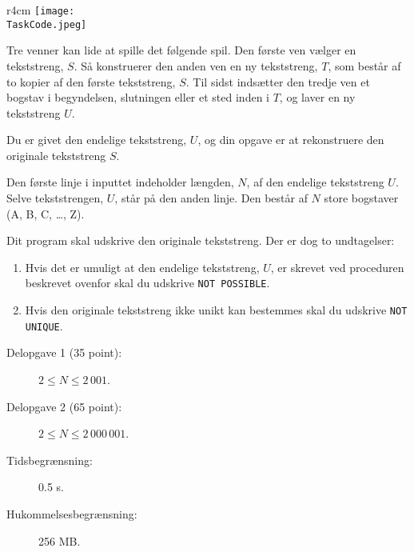 \documentclass{boi2014-dk}
\renewcommand{\TaskCode}{friends}
\begin{document}
    \begin{wrapfigure}{r}{4cm}
        \vspace{-24pt}
		\texttt{[image: \\TaskCode.jpeg]}
	\end{wrapfigure}
	Tre venner kan lide at spille det følgende spil.
	Den første ven vælger en tekststreng, $S$.
	Så konstruerer den anden ven en ny tekststreng, $T$, som
	består af to kopier af den første tekststreng, $S$.
	Til sidst indsætter den tredje ven et bogstav i begyndelsen, slutningen
    eller et sted inden i $T$, og laver en ny tekststreng $U$.

    \Task
    Du er givet den endelige tekststreng, $U$, og din
    opgave er at rekonstruere den originale tekststreng $S$.

    \Input
    Den første linje i inputtet indeholder længden, $N$, af den
    endelige tekststreng $U$.
	Selve tekststrengen, $U$, står på den anden linje.
    Den består af $N$ store bogstaver (A, B, C, \ldots, Z).

    \Output
	Dit program skal udskrive den originale tekststreng.
	Der er dog to undtagelser:
    \begin{enumerate}
    	\item Hvis det er umuligt at den endelige tekststreng, $U$, er
    	skrevet ved proceduren beskrevet ovenfor skal du udskrive
    	 {\tt NOT POSSIBLE}.
    	\item Hvis den originale tekststreng ikke unikt kan bestemmes
    	skal du udskrive {\tt NOT UNIQUE}.
    \end{enumerate}


    \Examples


    \Scoring

    \begin{description}
        \item[Delopgave 1 (35 point):] $2 \le N \le 2\,001$.
        \item[Delopgave 2 (65 point):] $2 \le N \le 2\,000\,001$.
    \end{description}

    \Constraints

    \begin{description}
        \item[Tidsbegrænsning:] 0.5 s.
        \item[Hukommelsesbegrænsning:] 256 MB.
    \end{description}
\end{document}
